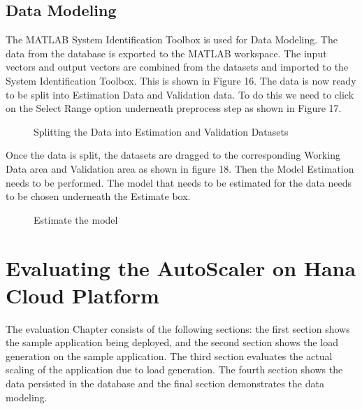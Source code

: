 \documentclass[article,type=msc,colorback,12pt,accentcolor=tud7b,table]{tudthesis}
\begin{document}
	\subsection{Data Modeling}
 
 The MATLAB System Identification Toolbox is used for Data Modeling. The data from the database is exported to the MATLAB workspace. The input vectors and output vectors are combined from the datasets and imported to the System Identification Toolbox. This is shown in Figure 16.  
  The data is now ready to be split into Estimation Data and Validation data. To do this we need to click on the Select Range option underneath preprocess step as shown in Figure 17. 
  
    \begin{figure}[h]
    	\begin{center}
    		\makebox[\textwidth]{\texttt{[image: D7]}}
    	\end{center}
    	\caption{Splitting the Data into Estimation and Validation Datasets}
    \end{figure}
 
 Once the data is split, the datasets are dragged to the corresponding Working Data area and Validation area as shown in figure 18. Then the Model Estimation needs to be performed. The model that needs to be estimated for the data needs to be chosen underneath the Estimate box.
 
     \begin{figure}[h]
     	\begin{center}
     		\makebox[\textwidth]{\texttt{[image: D8]}}
     	\end{center}
     	\caption{Estimate the model}
     \end{figure}

 
 \cleardoublepage
 \section{Evaluating the AutoScaler on Hana Cloud Platform}
 
 The evaluation Chapter consists of the following sections: the first section shows the sample application being deployed, and the second section shows the load generation on the sample application. The third section evaluates the actual scaling of the application due to load generation. The fourth section shows the data persisted in the database and the final section demonstrates the data modeling. 
\end{document}
